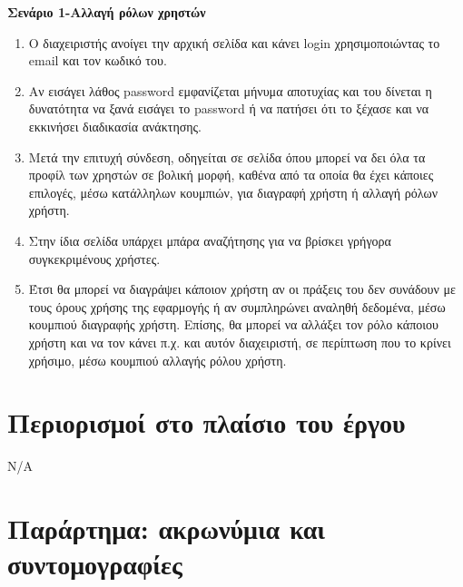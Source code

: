 \documentclass[12pt, oneside, a4paper]{report}
\begin{document}
\newpage
\textbf{Σενάριο 1-Αλλαγή ρόλων χρηστών}
\begin{enumerate}
 \item  Ο διαχειριστής ανοίγει την αρχική σελίδα και κάνει login χρησιμοποιώντας το email και τον κωδικό του.
 \item Αν εισάγει λάθος password εμφανίζεται μήνυμα αποτυχίας και του δίνεται η δυνατότητα να ξανά εισάγει το password ή να πατήσει ότι το ξέχασε και να εκκινήσει διαδικασία ανάκτησης.
 \item Μετά την επιτυχή σύνδεση, οδηγείται σε σελίδα όπου μπορεί να δει όλα τα προφίλ των χρηστών σε βολική μορφή, καθένα από τα οποία θα έχει κάποιες επιλογές, μέσω κατάλληλων κουμπιών, για διαγραφή χρήστη ή αλλαγή ρόλων χρήστη. 
 \item Στην ίδια σελίδα υπάρχει μπάρα αναζήτησης για να βρίσκει γρήγορα συγκεκριμένους χρήστες.
 \item Έτσι θα μπορεί να διαγράψει κάποιον χρήστη αν οι πράξεις του δεν συνάδουν με τους όρους χρήσης της εφαρμογής ή αν συμπληρώνει αναληθή δεδομένα, μέσω κουμπιού διαγραφής χρήστη. Επίσης, θα μπορεί να αλλάξει τον ρόλο κάποιου χρήστη και να τον κάνει π.χ. και αυτόν διαχειριστή, σε περίπτωση που το κρίνει χρήσιμο, μέσω κουμπιού αλλαγής ρόλου χρήστη.
\end{enumerate}

\section{Περιορισμοί στο πλαίσιο του έργου}
Ν/Α

\section{Παράρτημα: ακρωνύμια και συντομογραφίες}
\end{document}
